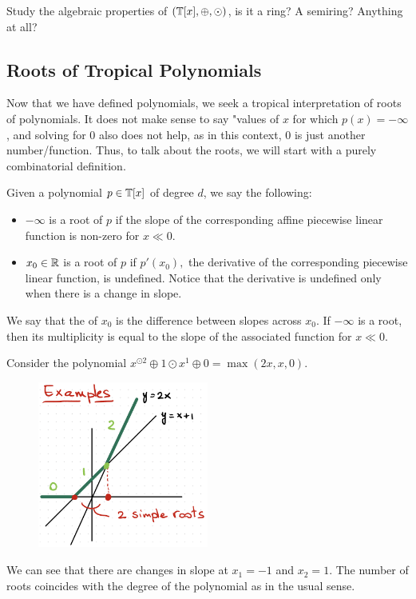 \documentclass[12pt]{memoir}
\theoremstyle{definition}
\begin{document}
\begin{Ej}
    Study the algebraic properties of $(\mathbb{T}[x],\oplus,\odot)$, is it a ring? A semiring? Anything at all?
\end{Ej}

\subsection{Roots of Tropical Polynomials} %

Now that we have defined polynomials, we seek a tropical interpretation of roots of polynomials. It does not make sense to say "values of $x$ for which $p(x)= - \infty$, and solving for $0$ also does not help, as in this context, $0$ is just another number/function. Thus, to talk about the roots, we will start with a purely combinatorial definition. 

\begin{Def}
    Given a polynomial $p\in\mathbb{T}[x]$ of degree $d$, we say the following:
    \begin{itemize}
        \item $-\infty$ is a root of $p$ if the slope of the corresponding affine piecewise linear function is non-zero for $x\ll 0$.
        \item $x_0\in\mathbb{R}$ is a root of $p$ if $p'(x_0),$ the derivative of the corresponding piecewise linear function, is undefined. Notice that the derivative is undefined only when there is a change in slope.
    \end{itemize}
    We say that the  of $x_0$ is the difference between slopes across $x_0$. If $-\infty$ is a root, then its multiplicity is equal to the slope of the associated function for $x\ll 0$.
\end{Def}

\begin{Ex}
    Consider the polynomial $x^{\odot2}\oplus1\odot x^1\oplus 0=\max(2x,x,0)$.
    \begin{figure}[h!]
        \centering
        \includegraphics[width=0.5\textwidth]{figs/fig3-3SimpleFiniteRootsTropicalPolynomial.png}
        \label{fig:3.3-SimpleFiniteRoots}
    \end{figure}
    
    We can see that there are changes in slope at $x_1=-1$ and $x_2=1$. The number of roots coincides with the degree of the polynomial as in the usual sense.
\end{Ex}
\end{document}
